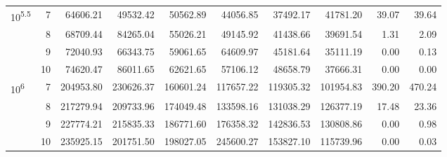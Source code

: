 \begin{table}[!ht]
\begin{adjustwidth}{-2.25in}{0in}
{\begin{tabular}{|l|r|r|r|r|r|r|r|r|r|}
  10\textsuperscript{5.5} & 7 & 64606.21 & 49532.42 & 50562.89 & 44056.85 & 37492.17 & 41781.20 & 39.07 & 39.64 \\ \cline{2-10}
   & 8 & 68709.44 & 84265.04 & 55026.21 & 49145.92 & 41438.66 & 39691.54 & 1.31 & 2.09 \\ \cline{2-10}
   & 9 & 72040.93 & 66343.75 & 59061.65 & 64609.97 & 45181.64 & 35111.19 & 0.00 & 0.13 \\ \cline{2-10}
   & 10 & 74620.47 & 86011.65 & 62621.65 & 57106.12 & 48658.79 & 37666.31 & 0.00 & 0.00 \\ \hline
  10\textsuperscript{6} & 7 & 204953.80 & 230626.37 & 160601.24 & 117657.22 & 119305.32 & 101954.83 & 390.20 & 470.24 \\ \cline{2-10}
   & 8 & 217279.94 & 209733.96 & 174049.48 & 133598.16 & 131038.29 & 126377.19 & 17.48 & 23.36 \\ \cline{2-10}
   & 9 & 227774.21 & 215835.33 & 186771.60 & 176358.32 & 142836.53 & 130808.86 & 0.00 & 0.98 \\ \cline{2-10}
   & 10 & 235925.15 & 201751.50 & 198027.05 & 245600.27 & 153827.10 & 115739.96 & 0.00 & 0.03 \\ 
   \hline
\end{tabular}}
\begin{flushleft}
\end{flushleft}
\end{adjustwidth}
\end{table}
